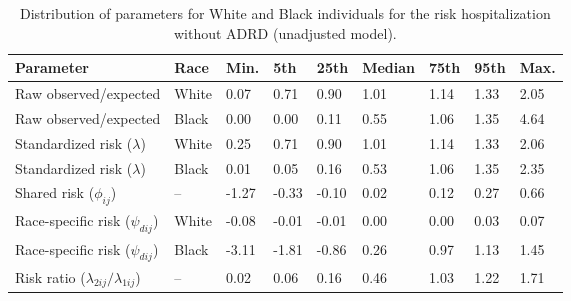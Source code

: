 \begin{table}[ht]
\centering
\begin{tabular}{lllllllll}
  \hline
Parameter & Race & Min. & 5th & 25th & Median & 75th & 95th & Max. \\ 
  \hline
Raw observed/expected & White &  0.07 &  0.71 &  0.90 & 1.01 & 1.14 & 1.33 & 2.05 \\ 
  Raw observed/expected & Black &  0.00 &  0.00 &  0.11 & 0.55 & 1.06 & 1.35 & 4.64 \\ 
  Standardized risk ($\lambda$) & White &  0.25 &  0.71 &  0.90 & 1.01 & 1.14 & 1.33 & 2.06 \\ 
  Standardized risk ($\lambda$) & Black &  0.01 &  0.05 &  0.16 & 0.53 & 1.06 & 1.35 & 2.35 \\ 
  Shared risk ($\phi_{ij}$) & -- & -1.27 & -0.33 & -0.10 & 0.02 & 0.12 & 0.27 & 0.66 \\ 
  Race-specific risk ($\psi_{dij}$) & White & -0.08 & -0.01 & -0.01 & 0.00 & 0.00 & 0.03 & 0.07 \\ 
  Race-specific risk ($\psi_{dij}$) & Black & -3.11 & -1.81 & -0.86 & 0.26 & 0.97 & 1.13 & 1.45 \\ 
  Risk ratio ($\lambda_{2ij}/\lambda_{1ij}$) & -- &  0.02 &  0.06 &  0.16 & 0.46 & 1.03 & 1.22 & 1.71 \\ 
   \hline
\end{tabular}
\caption{Distribution of parameters for White and Black individuals for the risk hospitalization without ADRD (unadjusted model).} 
\label{tab:summary_stats_hosp}
\end{table}
